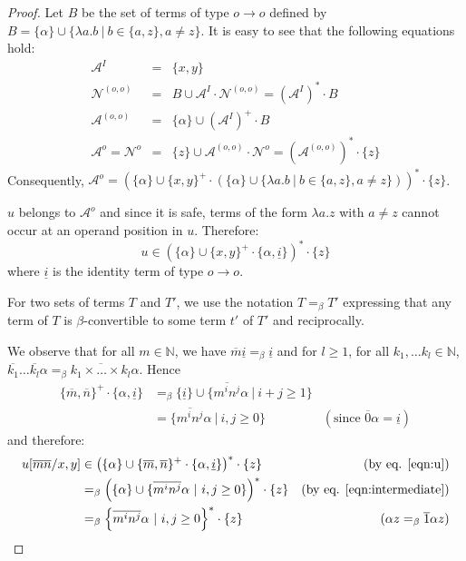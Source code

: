 \documentclass{llncs}
\newcommand{\encode}[1]{\overline{#1}}
\newcommand\union{\cup}
\newcommand\nat{\mathbb{N}}
\begin{document}
\begin{proof}
Let $B$ be the set of terms of type $o\rightarrow o$ defined by $B = \{ \alpha \} \union \{ \lambda a.b \ | \ b \in \{a,z\}, a \neq z \}$.
It is easy to see that the following equations hold:
\begin{eqnarray*}
\mathcal{A}^I &=& \{ x,y \} \\
\mathcal{N}^{(o,o)} &=& B \union \mathcal{A}^I \cdot
\mathcal{N}^{(o,o)} = (\mathcal{A}^I)^* \cdot B \\
\mathcal{A}^{(o,o)} &=& \{ \alpha \} \union (\mathcal{A}^I)^+ \cdot B \\
\mathcal{A}^o = \mathcal{N}^o &=& \{ z \} \union \mathcal{A}^{(o,o)} \cdot \mathcal{N}^o = (\mathcal{A}^{(o,o)})^* \cdot \{ z \}
\end{eqnarray*}
Consequently, $\mathcal{A}^o = \left( \{\alpha \} \union \{x,y\}^+ \cdot \left( \{\alpha \} \union \{\lambda a.b \ | \ b \in \{a,z\}, a \neq z \} \right) \right)^* \cdot \{ z \}$.

$u$ belongs to $\mathcal{A}^o$ and since it is safe,
terms of the form $\lambda a . z$ with $a \neq z$ cannot occur at an operand position in $u$. Therefore:
\begin{equation}
u \in \left( \{\alpha\} \union \{x,y\}^+ \cdot \{\alpha,
\underline{i} \} \right)^* \cdot \{ z \} \label{eqn:u}
\end{equation}
where $\underline{i}$ is the identity term of type $o\rightarrow o$.

For two sets of terms $T$ and $T'$, we use the notation $T =_\beta T'$ expressing that any term of $T$ is $\beta$-convertible to some term $t'$ of $T'$ and reciprocally.

We observe that for all $m \in \nat$, we have $\encode{m} \underline{i} =_\beta \underline{i}$ and for $l\geq 1$, for all $k_1, \ldots k_l \in \nat$, 
$\encode{k_1}\ldots \encode{k_l} \alpha =_\beta
\encode{k_1\times \ldots \times k_l} \alpha$. Hence
\begin{align}
\{\encode{m},\encode{n}\}^+ \cdot \{\alpha, \underline{i} \} &=_\beta
\{ \underline{i} \} \union
\{ \encode{m^i n^j} \alpha \ |\ i+j \geq 1 \} \nonumber \\
&= \{ \encode{m^i n^j} \alpha \ |\ i,j \geq 0 \} & ( \mbox{since } \encode{0} \alpha = \underline{i}) \label{eqn:intermediate}
\end{align}
and therefore:
\begin{align*}
u[\encode{m} \encode{n}/x,y] &\in \left( \{ \alpha \} \union \{\encode{m},\encode{n}\}^+ \cdot \{\alpha, \underline{i} \} \right)^* \cdot \{ z \}  & \mbox{(by eq. \ref{eqn:u})} \\
&=_\beta \left( \{\alpha \} \union \{ \encode{m^i n^j}
\alpha \ | \ i,j \geq 0 \} \right)^* \cdot \{ z \} & \mbox{(by eq. \ref{eqn:intermediate})}  \\
&=_\beta \left\{ \encode{m^i n^j}
\alpha \ | \ i,j \geq 0 \right\}^* \cdot \{ z \} & \mbox{($\alpha z =_\beta \encode{1} \alpha z$)}
\end{align*} 


\end{proof}
\end{document}

